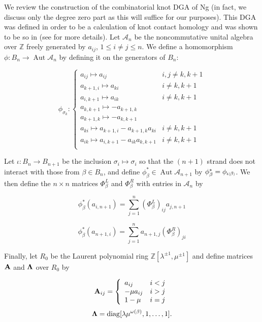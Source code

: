 \documentclass[11pt]{amsart}
\def\Z{{\mathbb Z}}
\def\A{{\mathcal A}}
\def\s{{\sigma}}
\newcommand*{\subsmallp}[1]{\scalebox{.5}{\ensuremath#1}}
\newcommand\Aut{\operatorname{Aut}}
\newcommand\diag{\operatorname{diag}}
\theoremstyle{definition}
\begin{document}
  We review the construction of the combinatorial knot DGA of Ng (in fact, we discuss only the degree zero part as this will suffice for our purposes). This DGA was defined in order to be a calculation of knot contact homology and was shown to be so in \cite{EENS12} (see \cite{Ng12} for more details). Let $\A_n$ be the noncommutative unital algebra over $\Z$ freely generated by $a_{ij}$, $1\le i\ne j\le n$. We define a homomorphism $\phi : B_n \rightarrow\Aut \A_n$ by defining it on the generators of $B_n$:

  \begin{equation}
  \phi_{\s_k}\colon
  \left\{
       \begin{array}{lr}
         a_{ij}\mapsto a_{ij} & i,j\ne k,k+1\\
         a_{k+1,i}\mapsto a_{ki} & i\ne k,k+1\\
         a_{i,k+1}\mapsto a_{ik} & i\ne k,k+1\\
         a_{k,k+1}\mapsto -a_{k+1,k} & \\
         a_{k+1,k}\mapsto -a_{k,k+1} & \\
         a_{ki}\mapsto a_{k+1,i} - a_{k+1,k}a_{ki} & i\ne k,k+1\\
         a_{ik}\mapsto a_{i,k+1} - a_{ik}a_{k,k+1} & i\ne k,k+1\\
       \end{array}
  \right.
  \label{DefnPhiMap}
  \end{equation}

  Let $\iota\colon B_n \rightarrow B_{n+1}$ be the inclusion $\s_i\mapsto\s_i$ so that the $(n+1)$ strand does not interact with those from $\beta\in B_n$, and define $\phi_\beta^*\in \Aut \A_{n+1}$ by $\phi_\beta^* = \phi_{\iota\subsmallp(\beta\subsmallp)}$. We then define the $n\times n$ matrices $\Phi_\beta^L$ and $\Phi_\beta^R$ with entries in $\A_n$ by

  $$\phi_\beta^*(a_{i,n+1}) = \sum_{j=1}^n(\Phi_\beta^L)_{ij}a_{j,n+1}$$

  $$\phi_\beta^*(a_{n+1,i}) = \sum_{j=1}^na_{n+1,j}(\Phi_\beta^R)_{ji}$$

  Finally, let $R_0$ be the Laurent polynomial ring $\Z[\lambda^{\pm1},\mu^{\pm1}]$ and define matrices $\bf{A}$ and $\bf{\Lambda}$ over $R_0$ by

  \begin{equation}
  {\bf A}_{ij} = 
  \left\{
       \begin{array}{lr}
        a_{ij} & i<j\\
        -\mu a_{ij} & i>j\\
        1-\mu & i = j\\
       \end{array}
  \right.
  \label{def:Amatrix}
  \end{equation}
  \begin{equation}
  {\bf \Lambda} = \diag[\lambda\mu^{\omega(\beta)},1,\ldots,1].
  \label{defn:Lambda}
  \end{equation}
\end{document}
